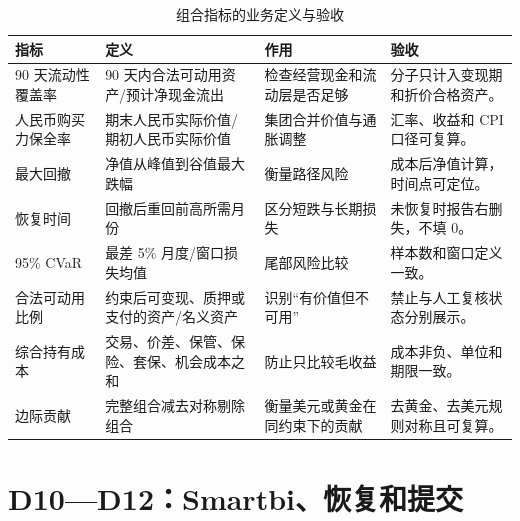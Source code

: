 \documentclass[UTF8,fontset=windows,12pt,openany]{ctexbook}
\begin{document}
\begin{longtable}{p{3.2cm}p{3.1cm}p{3.2cm}p{3.7cm}}
\caption{组合指标的业务定义与验收}\label{tab:portfolio-metrics}\\
\toprule
\textbf{指标} & \textbf{定义} & \textbf{作用} & \textbf{验收}\\
\midrule
90 天流动性覆盖率 & 90 天内合法可动用资产/预计净现金流出 & 检查经营现金和流动层是否足够 & 分子只计入变现期和折价合格资产。\\
人民币购买力保全率 & 期末人民币实际价值/期初人民币实际价值 & 集团合并价值与通胀调整 & 汇率、收益和 CPI 口径可复算。\\
最大回撤 & 净值从峰值到谷值最大跌幅 & 衡量路径风险 & 成本后净值计算，时间点可定位。\\
恢复时间 & 回撤后重回前高所需月份 & 区分短跌与长期损失 & 未恢复时报告右删失，不填 0。\\
95\% CVaR & 最差 5\% 月度/窗口损失均值 & 尾部风险比较 & 样本数和窗口定义一致。\\
合法可动用比例 & 约束后可变现、质押或支付的资产/名义资产 & 识别“有价值但不可用” & 禁止与人工复核状态分别展示。\\
综合持有成本 & 交易、价差、保管、保险、套保、机会成本之和 & 防止只比较毛收益 & 成本非负、单位和期限一致。\\
边际贡献 & 完整组合减去对称剔除组合 & 衡量美元或黄金在同约束下的贡献 & 去黄金、去美元规则对称且可复算。\\
\bottomrule
\end{longtable}

\chapter{D10—D12：Smartbi、恢复和提交}
\end{document}
